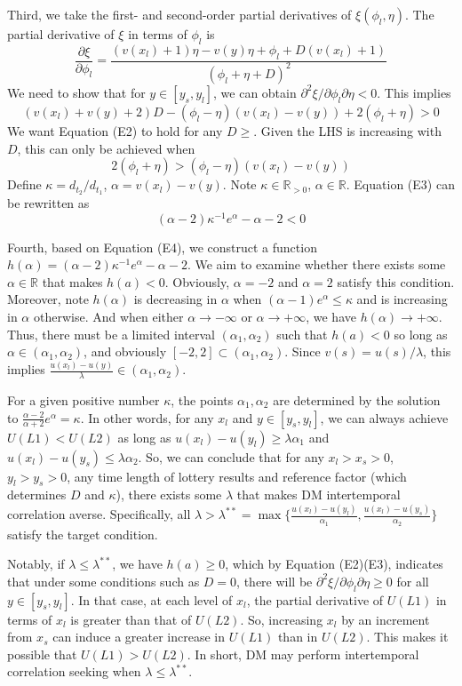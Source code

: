 \documentclass[
  12pt,
]{article}
\begin{document}
Third, we take the first- and second-order partial derivatives of
\(\xi(\phi_l,\eta)\). The partial derivative of \(\xi\) in terms of
\(\phi_l\) is\[
\frac{\partial \xi}{\partial \phi_l}=\frac{(v(x_l)+1)\eta-v(y)\eta+\phi_l+D(v(x_l)+1)}{(\phi_l+\eta+D)^2}
\]We need to show that for \(y\in[y_s,y_l]\), we can obtain
\(\partial^2 \xi/\partial \phi_l\partial \eta<0\). This
implies\[\tag{E2}
(v(x_l)+v(y)+2)D-(\phi_l-\eta)(v(x_l)-v(y))+2(\phi_l+\eta)>0
\]We want Equation (E2) to hold for any \(D\geq\). Given the LHS is
increasing with \(D\), this can only be achieved when\[\tag{E3}
2(\phi_l+\eta)>(\phi_l-\eta)(v(x_l)-v(y))
\]Define \(\kappa=d_{t_2}/d_{t_1}\), \(\alpha=v(x_l)-v(y)\). Note
\(\kappa\in \mathbb{R}_{>0}\), \(\alpha\in\mathbb{R}\). Equation (E3)
can be rewritten as\[\tag{E4}
(\alpha-2)\kappa^{-1} e^{\alpha}-\alpha-2<0
\]

Fourth, based on Equation (E4), we construct a function
\(h(\alpha)=(\alpha-2)\kappa^{-1} e^\alpha-\alpha-2\). We aim to examine
whether there exists some \(\alpha\in\mathbb{R}\) that makes \(h(a)<0\).
Obviously, \(\alpha=-2\) and \(\alpha=2\) satisfy this condition.
Moreover, note \(h(\alpha)\) is decreasing in \(\alpha\) when
\((\alpha-1)e^{\alpha}\leq \kappa\) and is increasing in \(\alpha\)
otherwise. And when either \(\alpha\rightarrow -\infty\) or
\(\alpha \rightarrow +\infty\), we have
\(h(\alpha)\rightarrow +\infty\). Thus, there must be a limited interval
\((\alpha_1,\alpha_2)\) such that \(h(a)<0\) so long as
\(\alpha\in(\alpha_1,\alpha_2)\), and obviously
\([-2,2]\subset(\alpha_1,\alpha_2)\). Since \(v(s)=u(s)/\lambda\), this
implies \(\frac{u(x_l)-u(y)}{\lambda}\in(\alpha_1,\alpha_2)\).

For a given positive number \(\kappa\), the points \(\alpha_1,\alpha_2\)
are determined by the solution to
\(\frac{\alpha-2}{\alpha+2}e^{\alpha}=\kappa\). In other words, for any
\(x_l\) and \(y\in[y_s,y_l]\), we can always achieve \(U(L1)<U(L2)\) as
long as \(u(x_l)-u(y_l)\geq \lambda\alpha_1\) and
\(u(x_l)-u(y_s)\leq\lambda\alpha_2\). So, we can conclude that for any
\(x_l>x_s>0\), \(y_l>y_s>0\), any time length of lottery results and
reference factor (which determines \(D\) and \(\kappa\)), there exists
some \(\lambda\) that makes DM intertemporal correlation averse.
Specifically, all
\(\lambda>\lambda^{**} ={\max}\{\frac{u(x_l)-u(y_l)}{\alpha_1},\frac{u(x_l)-u(y_s)}{\alpha_2}\}\)
satisfy the target condition.

Notably, if \(\lambda\leq\lambda^{**}\), we have \(h(a)\geq0\), which by
Equation (E2)(E3), indicates that under some conditions such as \(D=0\),
there will be \(\partial^2 \xi/\partial \phi_l\partial \eta\geq0\) for
all \(y\in[y_s,y_l]\). In that case, at each level of \(x_l\), the
partial derivative of \(U(L1)\) in terms of \(x_l\) is greater than that
of \(U(L2)\). So, increasing \(x_l\) by an increment from \(x_s\) can
induce a greater increase in \(U(L1)\) than in \(U(L2)\). This makes it
possible that \(U(L1)>U(L2)\). In short, DM may perform intertemporal
correlation seeking when \(\lambda\leq\lambda^{**}\).
\end{document}
